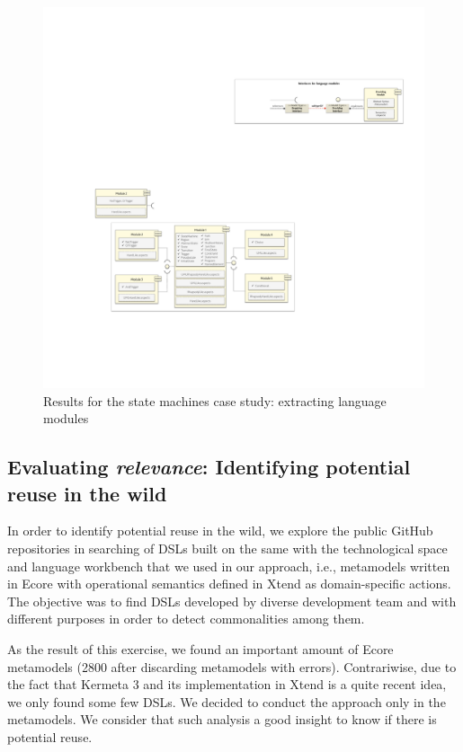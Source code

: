 \begin{figure}
\centering
\includegraphics[width=1\linewidth]{images/puzzle-modularization.pdf}
\caption{Results for the state machines case study: extracting language modules}
\label{fig:puzzle-modularization}
\end{figure}

\subsection{Evaluating \textit{relevance}: Identifying potential reuse in the wild}

In order to identify potential reuse in the wild, we explore the public GitHub repositories in searching of DSLs built on the same with the technological space and language workbench that we used in our approach, i.e., metamodels written in Ecore with operational semantics defined in Xtend as domain-specific actions. The objective was to find DSLs developed by diverse development team and with different purposes in order to detect commonalities among them. 

As the result of this exercise, we found an important amount of Ecore metamodels (2800 after discarding metamodels with errors). Contrariwise, due to the fact that Kermeta 3 and its implementation in Xtend is a quite recent idea, we only found some few DSLs. We decided to conduct the approach only in the metamodels. We consider that such analysis a good insight to know if there is potential reuse.

